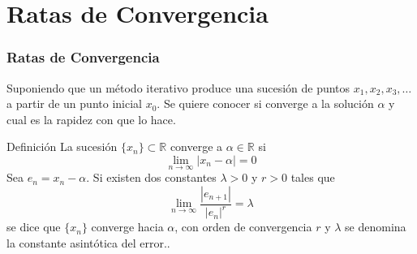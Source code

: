 \documentclass{beamer}
\begin{document}
\section{Ratas de Convergencia}
\frame
{
 \frametitle{Ratas de Convergencia}
Suponiendo que un m\'etodo iterativo produce una sucesi\'on de puntos $x_1, x_2,x_3,\ldots$ a partir de un punto inicial $x_0$. Se
quiere conocer si converge a la soluci\'on $\alpha$ y cual es la rapidez con que lo hace.
\begin{block}{Definici\'on}
  La sucesi\'on $\{x_n\} \subset \mathbb{R}$ converge a $\alpha \in \mathbb{R}$ si
$$
\lim_{n\to\infty}|x_n -\alpha|=0
$$
Sea $e_n = x_n - \alpha$. Si existen dos constantes $\lambda > 0$ y $r > 0$ tales que
$$
\lim_{n \to \infty}\frac{|e_{n+1}|}{|e_n|^{r}}=\lambda
$$
se dice que $\{x_n\}$ converge hacia $\alpha$, con orden de convergencia $r$ y $\lambda$ se denomina la constante asint\'otica del
error..
\end{block}
}
\end{document}
